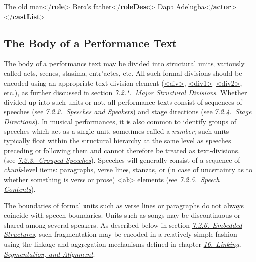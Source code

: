 \begin{shaded}
\mbox{}\newline 
{}\mbox{}\newline 
\hspace*{1em}The old man{</\textbf{role}>}\mbox{}\newline 
\hspace*{1em}Bero's father{</\textbf{roleDesc}>}\mbox{}\newline 
\hspace*{1em}Dapo Adelugba{</\textbf{actor}>}\mbox{}\newline 
{}\mbox{}\newline 
{</\textbf{castList}>}\end{shaded}\egroup\par \noindent  
\subsection[{The Body of a Performance Text}]{The Body of a Performance Text}\label{DRBOD}\par
The body of a performance text may be divided into structural units, variously called acts, scenes, stasima, entr'actes, etc. All such formal divisions should be encoded using an appropriate text-division element (\hyperref[TEI.div]{<div>}, \hyperref[TEI.div1]{<div1>}, \hyperref[TEI.div2]{<div2>}, etc.), as further discussed in section \textit{\hyperref[DRDIV]{7.2.1.\ Major Structural Divisions}}. Whether divided up into such units or not, all performance texts consist of sequences of speeches (see \textit{\hyperref[DRSP]{7.2.2.\ Speeches and Speakers}}) and stage directions (see \textit{\hyperref[DRSTA]{7.2.4.\ Stage Directions}}). In musical performances, it is also common to identify groups of speeches which act as a single unit, sometimes called a \textit{number}; such units typically float within the structural hierarchy at the same level as speeches preceding or following them and cannot therefore be treated as text-divisions. (see \textit{\hyperref[DRSPG]{7.2.3.\ Grouped Speeches}}). Speeches will generally consist of a sequence of \textit{chunk}-level items: paragraphs, verse lines, stanzas, or (in case of uncertainty as to whether something is verse or prose) \hyperref[TEI.ab]{<ab>} elements (see \textit{\hyperref[DRPAL]{7.2.5.\ Speech Contents}}).\par
The boundaries of formal units such as verse lines or paragraphs do not always coincide with speech boundaries. Units such as songs may be discontinuous or shared among several speakers. As described below in section \textit{\hyperref[DREMB]{7.2.6.\ Embedded Structures}}, such fragmentation may be encoded in a relatively simple fashion using the linkage and aggregation mechanisms defined in chapter \textit{\hyperref[SA]{16.\ Linking, Segmentation, and Alignment}}.
